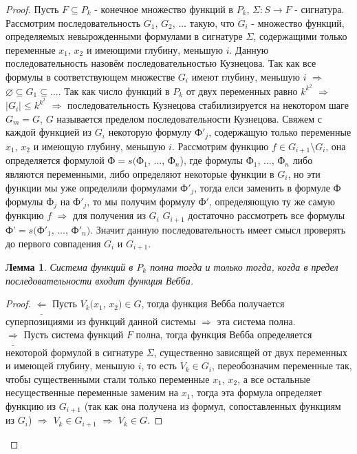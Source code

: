 \documentclass[a4paper, 12pt]{article}
\theoremstyle{definition}
\theoremstyle{plain}
\newtheorem*{lemma}{Лемма}
\theoremstyle{remark}
\begin{document}
  \begin{proof}
    Пусть $F\subseteq P_k$ - конечное множество функций в $P_k$, $\Sigma:S\to F$ - сигнатура. Рассмотрим последовательность $G_1$, $G_2$, $\ldots$ такую, что $G_i$ - множество функций, определяемых невырожденными формулами в сигнатуре $\Sigma$, содержащими только переменные $x_1$, $x_2$ и имеющими глубину, меньшую $i$. Данную последовательность назовём последовательностью Кузнецова. Так как все формулы в соответствующем множестве $G_i$ имеют глубину, меньшую $i$ $\Longrightarrow$ $\varnothing\subseteq G_1\subseteq\ldots$. Так как число функций в $P_k$ от двух переменных равно $k^{k^2}$ $\Longrightarrow$ $|G_i|\leqslant k^{k^2}$ $\Longrightarrow$ последовательность Кузнецова стабилизируется на некотором шаге $G_m=G$, $G$ называется пределом последовательности Кузнецова. Свяжем с каждой функцией из $G_i$ некоторую формулу Ф$'_j$, содержащую только переменные $x_1$, $x_2$ и имеющую глубину, меньшую $i$. Рассмотрим функцию $f\in G_{i+1}\setminus G_i$, она определяется формулой Ф$=s($Ф$_1$, $\ldots$, Ф$_n$), где формулы Ф$_1$, $\ldots$, Ф$_n$ либо являются переменными, либо определяют некоторые функции в $G_i$, но эти функции мы уже определили формулами Ф$'_j$, тогда елси заменить в формуле Ф формулы Ф$_j$ на Ф$'_j$, то мы получим формулу Ф$'$, определяющую ту же самую функцию $f$ $\Longrightarrow$ для получения из $G_i$ $G_{i+1}$ достаточно рассмотреть все формулы Ф'$=s($Ф$'_1$, $\ldots$, Ф$'_n)$. Значит данную последовательность имеет смысл проверять до первого совпадения $G_i$ и $G_{i+1}$.\\
    \begin{lemma}
      Система функций в $P_k$ полна тогда и только тогда, когда в предел последовательности входит функция Вебба.
    \end{lemma}
    \begin{proof}
      $\underline{\Longleftarrow}$ Пусть $V_k(x_1$, $x_2)\in G$, тогда функция Вебба получается суперпозициями из функций данной системы $\Longrightarrow$ эта система полна.\\
      $\underline{\Longrightarrow}$ Пусть система функций $F$ полна, тогда функция Вебба определяется некоторой формулой в сигнатуре $\Sigma$, существенно зависящей от двух переменных и имеющей глубину, меньшую $i$, то есть $V_k\in G_i$, переобозначим переменные так, чтобы существенными стали только переменные $x_1$, $x_2$, а все остальные несущественные переменные заменим на $x_1$, тогда эта формула определяет функцию из $G_{i+1}$ (так как она получена из формул, сопоставленных функциям из $G_i$) $\Longrightarrow$ $V_k\in G_{i+1}$ $\Longrightarrow$ $V_k\in G$.
    \end{proof}
  \end{proof}
\end{document}
